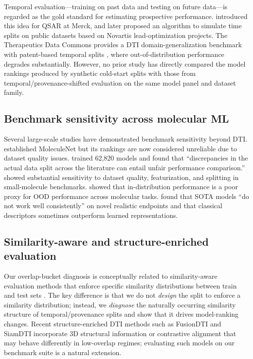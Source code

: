 \documentclass[referee,pdflatex,sn-basic,Numbered]{sn-jnl}
\begin{document}
Temporal evaluation—training on past data and testing on future data—is regarded as the gold standard for estimating prospective performance. \citet{sheridan2013timesplit} introduced this idea for QSAR at Merck, and \citet{simpd2023} later proposed an algorithm to simulate time splits on public datasets based on Novartis lead-optimization projects. The Therapeutics Data Commons provides a DTI domain-generalization benchmark with patent-based temporal splits \citep{huang2022tdc}, where out-of-distribution performance degrades substantially. However, no prior study has directly compared the model rankings produced by synthetic cold-start splits with those from temporal/provenance-shifted evaluation on the same model panel and dataset family.

\subsection{Benchmark sensitivity across molecular ML}

Several large-scale studies have demonstrated benchmark sensitivity beyond DTI. \citet{wu2018moleculenet} established MoleculeNet but its rankings are now considered unreliable due to dataset quality issues. \citet{luosystematicstudy2023} trained 62,820 models and found that ``discrepancies in the actual data split across the literature can entail unfair performance comparison.'' \citet{welqrate2024} showed substantial sensitivity to dataset quality, featurization, and splitting in small-molecule benchmarks. \citet{ektefaie2024generalizability} showed that in-distribution performance is a poor proxy for OOD performance across molecular tasks. \citet{benchmarkingcompoundactivity2024} found that SOTA models ``do not work well consistently'' on novel realistic endpoints and that classical descriptors sometimes outperform learned representations.

\subsection{Similarity-aware and structure-enriched evaluation}

Our overlap-bucket diagnosis is conceptually related to similarity-aware evaluation methods that enforce specific similarity distributions between train and test sets \citep{datasail2024,scaffoldsplitoverestimate2024}. The key difference is that we do not \emph{design} the split to enforce a similarity distribution; instead, we \emph{diagnose} the naturally occurring similarity structure of temporal/provenance splits and show that it drives model-ranking changes. Recent structure-enriched DTI methods such as FusionDTI and SiamDTI incorporate 3D structural information or contrastive alignment that may behave differently in low-overlap regimes; evaluating such models on our benchmark suite is a natural extension.
\end{document}
